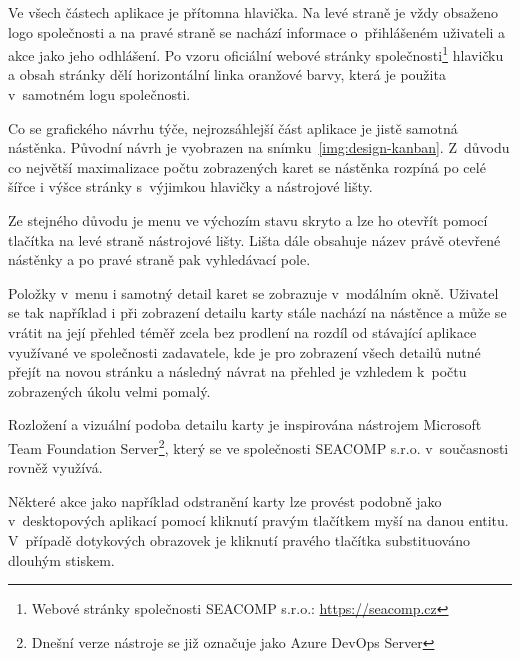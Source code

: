 Ve všech částech aplikace je přítomna hlavička. Na levé straně je vždy obsaženo logo společnosti a na pravé straně se nachází informace o~přihlášeném uživateli a akce jako jeho odhlášení. Po vzoru oficiální webové stránky společnosti\footnote{Webové stránky společnosti SEACOMP s.r.o.: \url{https://seacomp.cz}} hlavičku a obsah stránky dělí horizontální linka oranžové barvy, která je použita v~samotném logu společnosti.

Co se grafického návrhu týče, nejrozsáhlejší část aplikace je jistě samotná nástěnka. Původní návrh je vyobrazen na snímku~\ref{img:design-kanban}. Z~důvodu co největší maximalizace počtu zobrazených karet se nástěnka rozpíná po celé šířce i výšce stránky s~výjimkou hlavičky a nástrojové lišty.

Ze stejného důvodu je menu ve výchozím stavu skryto a lze ho otevřít pomocí tlačítka na levé straně nástrojové lišty. Lišta dále obsahuje název právě otevřené nástěnky a po pravé straně pak vyhledávací pole.

Položky v~menu i samotný detail karet se zobrazuje v~modálním okně. Uživatel se tak například i při zobrazení detailu karty stále nachází na nástěnce a může se vrátit na její přehled téměř zcela bez prodlení na rozdíl od stávající aplikace využívané ve společnosti zadavatele, kde je pro zobrazení všech detailů nutné přejít na novou stránku a následný návrat na přehled je vzhledem k~počtu zobrazených úkolu velmi pomalý.

Rozložení a vizuální podoba detailu karty je inspirována nástrojem Microsoft Team Foundation Server\footnote{Dnešní verze nástroje se již označuje jako Azure DevOps Server}, který se ve společnosti SEACOMP s.r.o. v~současnosti rovněž využívá.

Některé akce jako například odstranění karty lze provést podobně jako v~desktopových aplikací pomocí kliknutí pravým tlačítkem myší na danou entitu. V~případě dotykových obrazovek je kliknutí pravého tlačítka substituováno dlouhým stiskem. 

